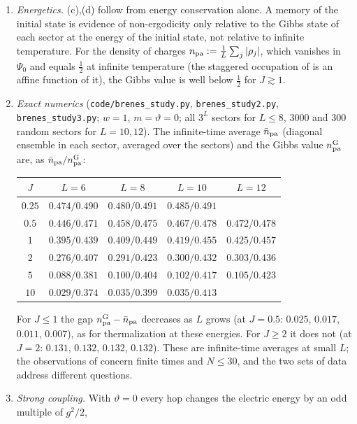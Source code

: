 \begin{remark}\label{rem:brenes}
\leavevmode
\begin{enumerate}[label=(\alph*)]
\item \emph{Energetics.}  (c),(d) follow from energy conservation alone.  A memory of the initial
state is evidence of non-ergodicity only relative to the Gibbs state of each sector at the energy of the initial
state, not relative to infinite temperature.  For the density of charges $n_{\rm pa}:=\frac1L\sum_j\left|\rho_j\right|$, which
vanishes in $\Psi_0$ and equals $\frac12$ at infinite temperature (the staggered occupation of \cite{Brenes2018} is an affine
function of it), the Gibbs value is well below $\frac12$ for $J\gtrsim1$.
\item \emph{Exact numerics} (\texttt{code/brenes\_study.py}, \texttt{brenes\_study2.py}, \texttt{brenes\_study3.py};
$w=1$, $m=\vartheta=0$; all $3^L$ sectors for $L\le8$, $3000$ and $300$ random sectors for $L=10,12$).  The infinite-time
average $\bar n_{\rm pa}$ (diagonal ensemble in each sector, averaged over the sectors) and the Gibbs value
$n^{\rm G}_{\rm pa}$ are, as $\bar n_{\rm pa}/n^{\rm G}_{\rm pa}$:
\begin{center}
\begin{tabular}{c|cccc}
$J$ & $L=6$ & $L=8$ & $L=10$ & $L=12$\\\hline
$0.25$ & $0.474/0.490$ & $0.480/0.491$ & $0.485/0.491$ & \\
$0.5$ & $0.446/0.471$ & $0.458/0.475$ & $0.467/0.478$ & $0.472/0.478$\\
$1$ & $0.395/0.439$ & $0.409/0.449$ & $0.419/0.455$ & $0.425/0.457$\\
$2$ & $0.276/0.407$ & $0.291/0.423$ & $0.300/0.432$ & $0.303/0.436$\\
$5$ & $0.088/0.381$ & $0.100/0.404$ & $0.102/0.417$ & $0.105/0.423$\\
$10$ & $0.029/0.374$ & $0.035/0.399$ & $0.035/0.413$ &
\end{tabular}
\end{center}
For $J\le1$ the gap $n^{\rm G}_{\rm pa}-\bar n_{\rm pa}$ decreases as $L$ grows (at $J=0.5$: $0.025$, $0.017$, $0.011$,
$0.007$), as for thermalization at these energies.  For $J\ge2$ it does not (at $J=2$: $0.131$, $0.132$, $0.132$, $0.132$).
These are infinite-time averages at small $L$; the observations of \cite{Brenes2018} concern finite times and
$N\le30$, and the two sets of data address different questions.
\item \emph{Strong coupling.}  With $\vartheta=0$ every hop changes the electric energy by an odd multiple of $g^2/2$,

\end{enumerate}
\end{remark}

